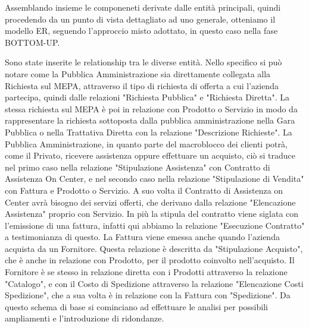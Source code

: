 Assemblando insieme le componeneti derivate dalle entità principali, quindi procedendo da un punto di vista dettagliato ad uno generale, otteniamo il modello ER, seguendo l'approccio misto adottato, in questo caso nella fase BOTTOM-UP.

\begin{landscape} %



\end{landscape}

Sono state inserite le relationship tra le diverse entità.\newline
Nello specifico si può notare come la Pubblica Amministrazione sia direttamente collegata alla Richiesta sul MEPA, attraverso il tipo di richiesta di offerta a cui l'azienda partecipa, quindi dalle relazioni "Richiesta Pubblica" e "Richiesta Diretta". La stessa richiesta sul MEPA è poi in relazione con Prodotto o Servizio in modo da rappresentare la richiesta sottoposta dalla pubblica amministrazione nella Gara Pubblica o nella Trattativa Diretta con la relazione "Descrizione Richieste".\newline
La Pubblica Amministrazione, in quanto parte del macroblocco dei clienti potrà, come il Privato, ricevere assistenza oppure effettuare un acquisto, ciò si traduce nel primo caso nella relazione "Stipulazione Assistenza" con Contratto di Assistenza On Center, e nel secondo caso nella relazione "Stipulazione di Vendita" con Fattura e Prodotto o Servizio.\newline
A suo volta il Contratto di Assistenza on Center avrà bisogno dei servizi offerti, che derivano dalla relazione "Elencazione Assistenza" proprio con Servizio. In più la stipula del contratto viene siglata con l'emissione di una fattura, infatti qui abbiamo la relazione "Esecuzione Contratto" a testimonianza di questo.\newline
La Fattura viene emessa anche quando l'azienda acquista da un Fornitore. Questa relazione è descritta da "Stipulazione Acquisto", che è anche in relazione con Prodotto, per il prodotto coinvolto nell'acquisto.\newline
Il Fornitore è se stesso in relazione diretta con i Prodotti attraverso la relazione "Catalogo", e con il Costo di Spedizione attraverso la relazione "Elencazione Costi Spedizione", che a sua volta è in relazione con la Fattura con "Spedizione".
\newline
Da questo schema di base si cominciano ad effettuare le analisi per possibili ampliamenti e l'introduzione di ridondanze.
